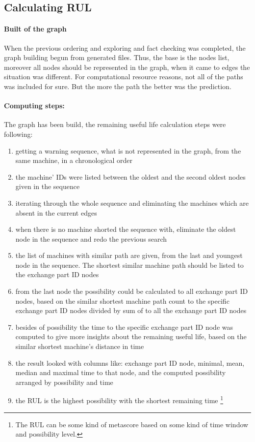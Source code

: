 	\subsection{Calculating RUL}
			\paragraph{Built of the graph}
			When the previous ordering and exploring and fact checking was completed, the graph building begun from generated files. Thus, the base is the nodes list, moreover all nodes should be represented in the graph, when it came to edges the situation was different. For computational resource reasons, not all of the paths was included for sure. But the more the path the better was the prediction.
			\paragraph{Computing steps:}
			The graph has been build, the remaining useful life calculation steps were following:
			\begin{enumerate}
				\item{getting a warning sequence, what is not represented in the graph, from the same machine, in a chronological order}
				\item{the machine' IDs were listed between the oldest and the second oldest nodes given in the sequence}
				\item{iterating through the whole sequence and eliminating the machines which are absent in the current edges}
				\item{when there is no machine shorted the sequence with, eliminate the oldest node in the sequence and redo the previous search}
				\item{the list of machines with similar path are given, from the last and youngest node in the sequence. The shortest similar machine path should be listed to the exchange part ID nodes}
				\item{from the last node the possibility could be calculated to all exchange part ID nodes, based on the similar shortest machine path count to the specific exchange part ID nodes divided by sum of to all the exchange part ID nodes}
				\item{besides of possibility the time to the specific exchange part ID node was computed to give more insights about the remaining useful life, based on the similar shortest machine's distance in time}
				\item{the result looked with columns like: exchange part ID node, minimal, mean, median and maximal time to that node, and the computed possibility arranged by possibility and time} 
		 		\item{the RUL is the highest possibility with the shortest remaining time} \footnote{The RUL can be some kind of metascore based on some kind of time window and possibility level.}
		 	\end{enumerate}
